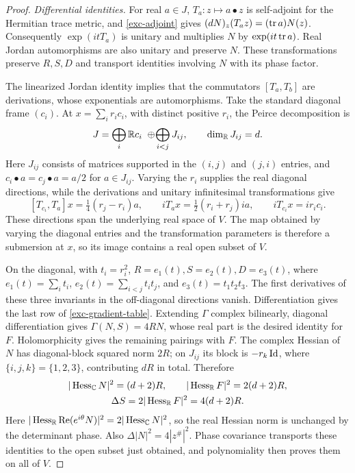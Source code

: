\begin{proof}
\emph{Differential identities.}
For real \(a\in J\), \(T_a:z\mapsto a\bullet z\)
is self-adjoint for the Hermitian trace metric, and
\eqref{exc-adjoint} gives \((dN)_z(T_az)=(\operatorname{tr} a)N(z)\).
Consequently \(\exp(itT_a)\) is unitary and multiplies \(N\)
by \(\exp(it\operatorname{tr} a)\). Real Jordan automorphisms are also
unitary and preserve \(N\). These transformations preserve
\(R,S,D\) and transport identities involving \(N\) with its
phase factor.

The linearized Jordan identity implies that the commutators
\([T_a,T_b]\) are derivations, whose exponentials are automorphisms.
Take the standard diagonal frame \((c_i)\). At
\(x=\sum_i r_ic_i\), with distinct positive \(r_i\), the
Peirce decomposition \cite[Section~3.2.6]{NadirashviliTkachevVladut14} is
\[
 J=\bigoplus_i\R c_i\ \oplus\!\bigoplus_{i<j}J_{ij},
 \qquad \dim_{\R}J_{ij}=d.
\]
Here \(J_{ij}\) consists of matrices supported in the \((i,j)\)
and \((j,i)\) entries, and
\(c_i\bullet a=c_j\bullet a=a/2\) for \(a\in J_{ij}\).
Varying the \(r_i\) supplies the real diagonal directions, while
the derivations and unitary infinitesimal transformations give
\[
 [T_{c_i},T_a]x=\tfrac14(r_j-r_i)a,\qquad
 iT_ax=\tfrac12(r_i+r_j)ia,\qquad iT_{c_i}x=ir_ic_i.
\]
These directions span the underlying real space of \(V\).
The map obtained by varying the diagonal entries and the transformation
parameters is therefore a submersion at \(x\), so its image contains
a real open subset of \(V\).

On the diagonal, with \(t_i=r_i^2\),
\(R=e_1(t), S=e_2(t), D=e_3(t)\), where
\(e_1(t)=\sum_i t_i\), \(e_2(t)=\sum_{i<j}t_it_j\), and
\(e_3(t)=t_1t_2t_3\). The first derivatives of
these three invariants in the off-diagonal directions vanish.
Differentiation gives the last row of \eqref{exc-gradient-table}.
Extending \(\Gamma\) complex bilinearly, diagonal differentiation
gives \(\Gamma(N,S)=4RN\), whose real part is the desired identity
for \(F\). Holomorphicity gives the remaining pairings with
\(F\). The complex Hessian of \(N\) has diagonal-block
squared norm \(2R\); on \(J_{ij}\) its block is
\(-r_k\operatorname{Id}\), where \(\{i,j,k\}=\{1,2,3\}\), contributing
\(dR\) in total. Therefore
\[
\begin{gathered}
 |\operatorname{Hess}_{\mathbb C}N|^2=(d+2)R,\qquad
 |\operatorname{Hess}_{\mathbb R}F|^2=2(d+2)R,\\
 \Delta S=2|\operatorname{Hess}_{\mathbb R}F|^2=4(d+2)R.
\end{gathered}
\]
Here \(|\operatorname{Hess}_{\mathbb R}\operatorname{Re}(e^{i\theta}N)|^2
=2|\operatorname{Hess}_{\mathbb C}N|^2\), so the real Hessian norm is
unchanged by the determinant phase.
Also \(\Delta|N|^2=4|z^\#|^2\). Phase covariance transports
these identities to the open subset just obtained, and polynomiality
then proves them on all of \(V\).


\end{proof}
